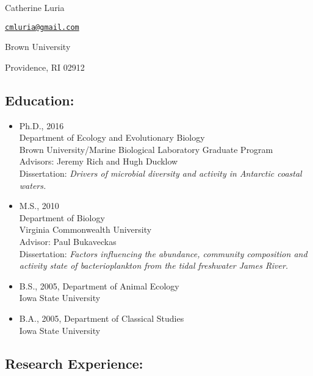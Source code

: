 
\begin{center}
{\Large Catherine Luria}

\href{mailto:cmluria@gmail.com}{\nolinkurl{cmluria@gmail.com}}

Brown University 

Providence, RI 02912
\end{center}

\subsection*{Education:}\label{education}

\begin{itemize}
\item
  Ph.D., 2016 \\
  Department of Ecology and Evolutionary Biology \\ 
  Brown University/Marine Biological Laboratory Graduate Program \\
  Advisors: Jeremy Rich and Hugh Ducklow \\
  Dissertation: \emph{Drivers of microbial diversity and activity in Antarctic coastal waters.} 
\item
  M.S., 2010 \\
  Department of Biology \\
  Virginia Commonwealth University \\
  Advisor: Paul Bukaveckas \\
  Dissertation: \emph{Factors influencing the abundance, community composition and activity state of bacterioplankton from the tidal freshwater James River.}
\item
  B.S., 2005, Department of Animal Ecology \\
  Iowa State University
\item
  B.A., 2005, Department of Classical Studies \\
  Iowa State University
\end{itemize}

\subsection*{Research Experience:}\label{research-experience}

